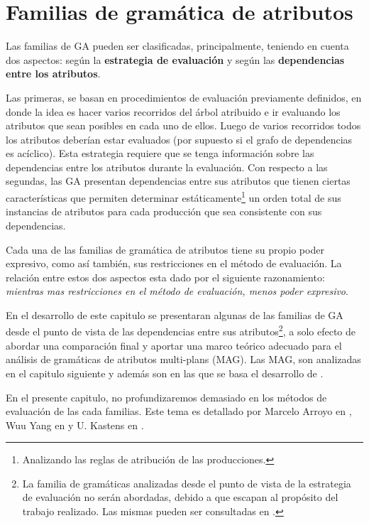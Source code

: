 \chapter{Familias de gramática de atributos}
\label{chap:clas_ag}
\minitoc

Las familias de GA pueden ser clasificadas, principalmente, teniendo en cuenta dos aspectos: según la \textbf{estrategia de evaluación} y según las \textbf{dependencias entre los atributos}. 

Las primeras, se basan en procedimientos de evaluación previamente definidos, en donde la idea es hacer varios recorridos del árbol atribuido e ir evaluando los atributos que sean posibles en cada uno de ellos. Luego de varios recorridos todos los atributos deberían estar evaluados (por supuesto si el grafo de dependencias es acíclico). Esta estrategia requiere que se tenga información sobre las dependencias entre los atributos durante la evaluación. Con respecto a las segundas, las GA presentan dependencias entre sus atributos que tienen ciertas características que permiten determinar estáticamente\footnote{Analizando las reglas de atribución de las producciones.} un orden total de sus instancias de atributos para cada producción que sea consistente con sus dependencias. 

Cada una de las familias de gramática de atributos tiene su propio poder expresivo, como así también, sus restricciones en el método de evaluación. La relación entre estos dos aspectos esta dado por el siguiente razonamiento: \textit{mientras mas restricciones en el método de evaluación, menos poder expresivo}.

En el desarrollo de este capitulo se presentaran algunas de las familias de GA desde el punto de vista de las dependencias entre sus atributos\footnote{La familia de gramáticas analizadas desde el punto de vista de la estrategia de evaluación no serán abordadas, debido a que escapan al propósito del trabajo realizado. Las mismas pueden ser consultadas en \cite{tesismarcelo}.}, a solo efecto de abordar una comparación final y aportar una marco teórico adecuado para el análisis de gramáticas de atributos multi-plans (MAG). Las MAG, son analizadas en el capitulo siguiente y además son en las que se basa el desarrollo de \maggen. 

En el presente capitulo, no profundizaremos demasiado en los métodos de evaluación de las cada familias. Este tema es detallado por Marcelo Arroyo en \cite{tesismarcelo}, Wuu Yang en \cite{wuu-yang2} y U. Kastens en \cite{kastens}.

